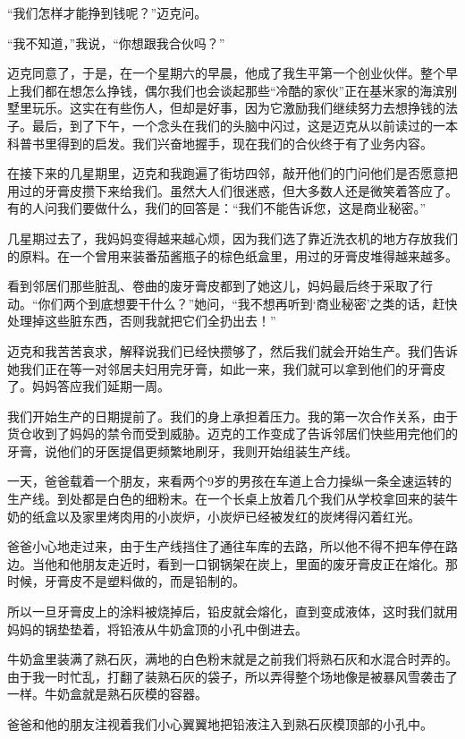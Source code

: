 “我们怎样才能挣到钱呢？”迈克问。

“我不知道，”我说，“你想跟我合伙吗？”

迈克同意了，于是，在一个星期六的早晨，他成了我生平第一个创业伙伴。整个早上我们都在想怎么挣钱，偶尔我们也会谈起那些“冷酷的家伙”正在基米家的海滨别墅里玩乐。这实在有些伤人，但却是好事，因为它激励我们继续努力去想挣钱的法子。最后，到了下午，一个念头在我们的头脑中闪过，这是迈克从以前读过的一本科普书里得到的启发。我们兴奋地握手，现在我们的合伙终于有了业务内容。

在接下来的几星期里，迈克和我跑遍了街坊四邻，敲开他们的门问他们是否愿意把用过的牙膏皮攒下来给我们。虽然大人们很迷惑，但大多数人还是微笑着答应了。有的人问我们要做什么，我们的回答是：“我们不能告诉您，这是商业秘密。”

几星期过去了，我妈妈变得越来越心烦，因为我们选了靠近洗衣机的地方存放我们的原料。在一个曾用来装番茄酱瓶子的棕色纸盒里，用过的牙膏皮堆得越来越多。

看到邻居们那些脏乱、卷曲的废牙膏皮都到了她这儿，妈妈最后终于采取了行动。“你们两个到底想要干什么？”她问，“我不想再听到‘商业秘密’之类的话，赶快处理掉这些脏东西，否则我就把它们全扔出去！”

迈克和我苦苦哀求，解释说我们已经快攒够了，然后我们就会开始生产。我们告诉她我们正在等一对邻居夫妇用完牙膏，如此一来，我们就可以拿到他们的牙膏皮了。妈妈答应我们延期一周。

我们开始生产的日期提前了。我们的身上承担着压力。我的第一次合作关系，由于货仓收到了妈妈的禁令而受到威胁。迈克的工作变成了告诉邻居们快些用完他们的牙膏，说他们的牙医提倡更频繁地刷牙，我则开始组装生产线。

一天，爸爸载着一个朋友，来看两个9岁的男孩在车道上合力操纵一条全速运转的生产线。到处都是白色的细粉末。在一个长桌上放着几个我们从学校拿回来的装牛奶的纸盒以及家里烤肉用的小炭炉，小炭炉已经被发红的炭烤得闪着红光。

爸爸小心地走过来，由于生产线挡住了通往车库的去路，所以他不得不把车停在路边。当他和他朋友走近时，看到一口钢锅架在炭上，里面的废牙膏皮正在熔化。那时候，牙膏皮不是塑料做的，而是铅制的。

所以一旦牙膏皮上的涂料被烧掉后，铅皮就会熔化，直到变成液体，这时我们就用妈妈的锅垫垫着，将铅液从牛奶盒顶的小孔中倒进去。

牛奶盒里装满了熟石灰，满地的白色粉末就是之前我们将熟石灰和水混合时弄的。由于我一时忙乱，打翻了装熟石灰的袋子，所以弄得整个场地像是被暴风雪袭击了一样。牛奶盒就是熟石灰模的容器。

爸爸和他的朋友注视着我们小心翼翼地把铅液注入到熟石灰模顶部的小孔中。

